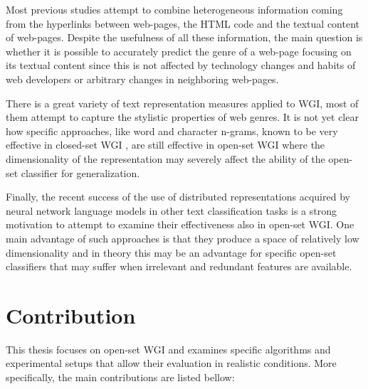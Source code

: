 \begin{itemize}
Most previous studies attempt to combine heterogeneous information coming from the hyperlinks between web-pages, the HTML code and the textual content of web-pages. Despite the usefulness of all these information, the main question is whether it is possible to accurately predict the genre of a web-page focusing on its textual content since this is not affected by technology changes and habits of web developers or arbitrary changes in neighboring web-pages. 

There is a great variety of text representation measures applied to WGI, most of them attempt to capture the stylistic properties of web genres. It is not yet clear how specific approaches, like word and character n-grams, known to be very effective in closed-set WGI \parencite{sharoff2010web}, are still effective in open-set WGI where the dimensionality of the representation may severely affect the ability of the open-set classifier for  generalization.

Finally, the recent success of the use of distributed representations acquired by neural network language models in other text classification tasks is a strong motivation to attempt to examine their effectiveness also in open-set WGI. One main advantage of such approaches is that they produce a space of relatively low dimensionality and in theory this may be an advantage for specific open-set classifiers that may suffer when irrelevant and redundant features are available.

\section{Contribution} \label{chap:introduction:sec:contribution}

This thesis focuses on open-set WGI and examines specific algorithms and experimental setups that allow their evaluation in realistic conditions. More specifically, the main contributions are listed bellow:


\end{itemize}
